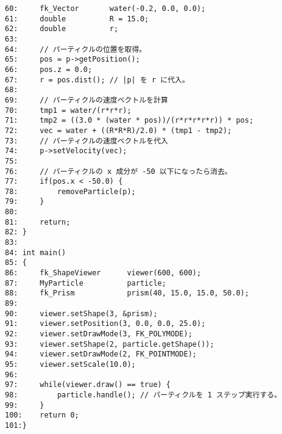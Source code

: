\begin{breakbox}
\begin{verbatim}
60:     fk_Vector       water(-0.2, 0.0, 0.0);
61:     double          R = 15.0;
62:     double          r;
63:  
64:     // パーティクルの位置を取得。
65:     pos = p->getPosition();
66:     pos.z = 0.0;
67:     r = pos.dist(); // |p| を r に代入。
68:  
69:     // パーティクルの速度ベクトルを計算
70:     tmp1 = water/(r*r*r);
71:     tmp2 = ((3.0 * (water * pos))/(r*r*r*r*r)) * pos;
72:     vec = water + ((R*R*R)/2.0) * (tmp1 - tmp2);
73:     // パーティクルの速度ベクトルを代入
74:     p->setVelocity(vec);
75:  
76:     // パーティクルの x 成分が -50 以下になったら消去。
77:     if(pos.x < -50.0) {
78:         removeParticle(p);
79:     }
80:  
81:     return;
82: }
83:  
84: int main()
85: {
86:     fk_ShapeViewer      viewer(600, 600);
87:     MyParticle          particle;
88:     fk_Prism            prism(40, 15.0, 15.0, 50.0);
89:
90:     viewer.setShape(3, &prism);
91:     viewer.setPosition(3, 0.0, 0.0, 25.0);
92:     viewer.setDrawMode(3, FK_POLYMODE);
93:     viewer.setShape(2, particle.getShape());
94:     viewer.setDrawMode(2, FK_POINTMODE);
95:     viewer.setScale(10.0);
96: 
97:     while(viewer.draw() == true) {
98:         particle.handle(); // パーティクルを 1 ステップ実行する。
99:     }
100:    return 0;
101:}
\end{verbatim}
\end{breakbox}
